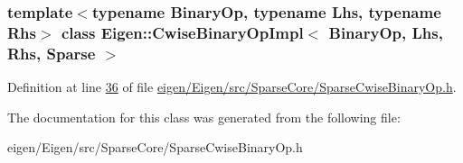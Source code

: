 \subsubsection*{template$<$typename Binary\+Op, typename Lhs, typename Rhs$>$\newline
class Eigen\+::\+Cwise\+Binary\+Op\+Impl$<$ Binary\+Op, Lhs, Rhs, Sparse $>$}



Definition at line \hyperlink{eigen_2_eigen_2src_2_sparse_core_2_sparse_cwise_binary_op_8h_source_l00036}{36} of file \hyperlink{eigen_2_eigen_2src_2_sparse_core_2_sparse_cwise_binary_op_8h_source}{eigen/\+Eigen/src/\+Sparse\+Core/\+Sparse\+Cwise\+Binary\+Op.\+h}.



The documentation for this class was generated from the following file\+:\begin{DoxyCompactItemize}
\item 
eigen/\+Eigen/src/\+Sparse\+Core/\+Sparse\+Cwise\+Binary\+Op.\+h\end{DoxyCompactItemize}
